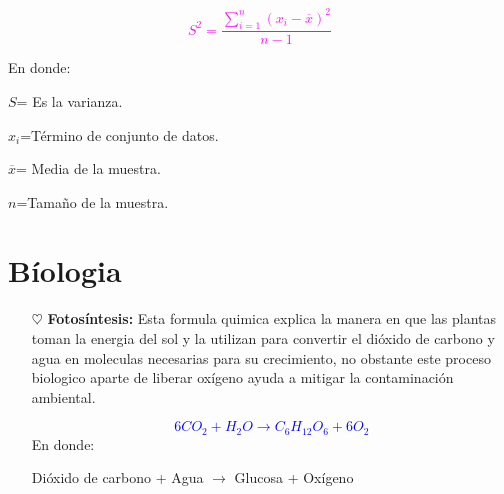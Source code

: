 \documentclass[letterpaper,12pt]{article}
\begin{document}
\begin{itemize}
\begin{itemize}
    {\textcolor{magenta}{$$S^{2}=\frac{\sum\limits_{i=1}^{n}(x_i-\overline{x})^{2}}{ n-1}$$}}
    
    En donde:
    
    $S$= Es la varianza.
    
    $x_i$=Término de conjunto de datos.
    
    $\overline{x}$= Media de la muestra.
    
    $n$=Tamaño de la muestra.
\section{Bíologia}
\begin{itemize}
    \item[$\heartsuit$]{\textbf{Fotosíntesis:}} Esta formula quimica explica la manera en que las plantas toman la energia del sol y la utilizan para convertir el dióxido de carbono y agua en  moleculas necesarias para su crecimiento, no obstante este proceso biologico aparte de liberar oxígeno ayuda a mitigar la contaminación ambiental.

\textcolor{blue}{$$6CO_2+H_2O \rightarrow C_6H_{12}O_6+6O_2$$}
En donde: 

\begin{center}
Dióxido de carbono + Agua $\rightarrow$  Glucosa + Oxígeno    
\end{center}

\end{itemize}

 \end{itemize}
    
\end{itemize}
\end{document}
